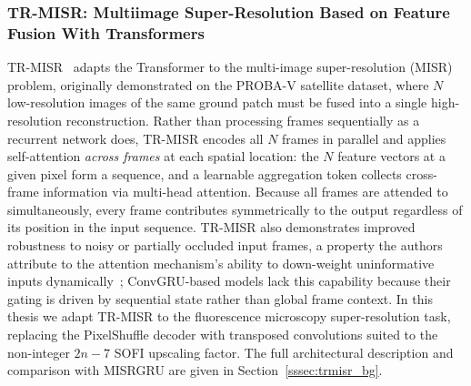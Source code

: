 \subsubsection{TR-MISR: Multiimage Super-Resolution Based on Feature Fusion With Transformers}
TR-MISR~\cite{TR-MISR-original} adapts the Transformer to the multi-image
super-resolution (MISR) problem, originally demonstrated on the PROBA-V satellite dataset, where
$N$ low-resolution images of the same ground patch must be fused into a single high-resolution
reconstruction.
Rather than processing frames sequentially as a recurrent network does, TR-MISR encodes all $N$
frames in parallel and applies self-attention \emph{across frames} at each spatial location: the
$N$ feature vectors at a given pixel form a sequence, and a learnable aggregation token collects
cross-frame information via multi-head attention.
Because all frames are attended to simultaneously, every frame contributes symmetrically to the
output regardless of its position in the input sequence.
TR-MISR also demonstrates improved robustness to noisy or partially occluded input frames,
a property the authors attribute to the attention mechanism's ability to down-weight uninformative
inputs dynamically~\cite{TR-MISR-original}; ConvGRU-based models lack this capability because
their gating is driven by sequential state rather than global frame context.
In this thesis we adapt TR-MISR to the fluorescence microscopy super-resolution task, replacing
the PixelShuffle decoder with transposed convolutions suited to the non-integer $2n{-}7$ SOFI
upscaling factor.
The full architectural description and comparison with MISRGRU are given in
Section~\ref{sssec:trmisr_bg}.

